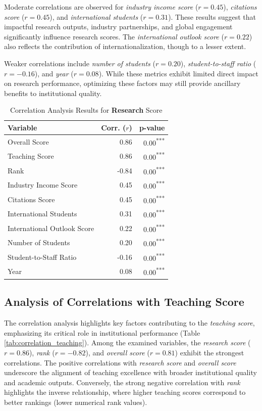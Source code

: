 \documentclass[sigconf]{acmart}
\begin{document}
Moderate correlations are observed for \textit{industry income score} ($r = 0.45$), \textit{citations score} ($r = 0.45$), and \textit{international students} ($r = 0.31$). These results suggest that impactful research outputs, industry partnerships, and global engagement significantly influence research scores. The \textit{international outlook score} ($r = 0.22$) also reflects the contribution of internationalization, though to a lesser extent.

Weaker correlations include \textit{number of students} ($r = 0.20$), \textit{student-to-staff ratio} ($r = -0.16$), and \textit{year} ($r = 0.08$). While these metrics exhibit limited direct impact on research performance, optimizing these factors may still provide ancillary benefits to institutional quality.

\begin{table}[h!]
	\centering
	\caption{Correlation Analysis Results for \textbf{Research} Score}
	\label{tab:correlation_research}
	\begin{tabular}{|l|r|r|}
		\hline
		\textbf{Variable} & \textbf{Corr. ($r$)} & \textbf{p-value} \\
		\hline
		Overall Score & 0.86 & 0.00\textsuperscript{***} \\
		Teaching Score & 0.86 & 0.00\textsuperscript{***} \\
		Rank & -0.84 & 0.00\textsuperscript{***} \\
		Industry Income Score & 0.45 & 0.00\textsuperscript{***} \\
		Citations Score & 0.45 & 0.00\textsuperscript{***} \\
		International Students & 0.31 & 0.00\textsuperscript{***} \\
		International Outlook Score & 0.22 & 0.00\textsuperscript{***} \\
		Number of Students & 0.20 & 0.00\textsuperscript{***} \\
		Student-to-Staff Ratio & -0.16 & 0.00\textsuperscript{***} \\
		Year & 0.08 & 0.00\textsuperscript{***} \\
		\hline
	\end{tabular}
\end{table}

\subsection{Analysis of Correlations with Teaching Score}

The correlation analysis highlights key factors contributing to the \textit{teaching score}, emphasizing its critical role in institutional performance (Table \ref{tab:correlation_teaching}). Among the examined variables, the \textit{research score} ($r = 0.86$), \textit{rank} ($r = -0.82$), and \textit{overall score} ($r = 0.81$) exhibit the strongest correlations. The positive correlations with \textit{research score} and \textit{overall score} underscore the alignment of teaching excellence with broader institutional quality and academic outputs. Conversely, the strong negative correlation with \textit{rank} highlights the inverse relationship, where higher teaching scores correspond to better rankings (lower numerical rank values).
\end{document}
